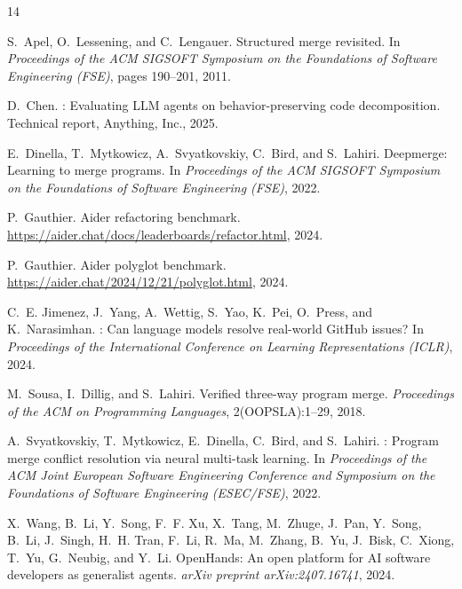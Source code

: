 \documentclass[11pt,a4paper]{article}
\begin{document}
\begin{thebibliography}{14}

S.~Apel, O.~Lessening, and C.~Lengauer.
\newblock Structured merge revisited.
\newblock In \emph{Proceedings of the ACM SIGSOFT Symposium on the Foundations of Software Engineering (FSE)}, pages 190--201, 2011.

D.~Chen.
: Evaluating {LLM} agents on behavior-preserving code decomposition.
\newblock Technical report, Anything, Inc., 2025.

E.~Dinella, T.~Mytkowicz, A.~Svyatkovskiy, C.~Bird, and S.~Lahiri.
\newblock Deepmerge: Learning to merge programs.
\newblock In \emph{Proceedings of the ACM SIGSOFT Symposium on the Foundations of Software Engineering (FSE)}, 2022.

P.~Gauthier.
\newblock Aider refactoring benchmark.
\newblock \url{https://aider.chat/docs/leaderboards/refactor.html}, 2024.

P.~Gauthier.
\newblock Aider polyglot benchmark.
\newblock \url{https://aider.chat/2024/12/21/polyglot.html}, 2024.

C.~E. Jimenez, J.~Yang, A.~Wettig, S.~Yao, K.~Pei, O.~Press, and K.~Narasimhan.
: Can language models resolve real-world {GitHub} issues?
\newblock In \emph{Proceedings of the International Conference on Learning Representations (ICLR)}, 2024.

M.~Sousa, I.~Dillig, and S.~Lahiri.
\newblock Verified three-way program merge.
\newblock \emph{Proceedings of the ACM on Programming Languages}, 2(OOPSLA):1--29, 2018.

A.~Svyatkovskiy, T.~Mytkowicz, E.~Dinella, C.~Bird, and S.~Lahiri.
: Program merge conflict resolution via neural multi-task learning.
\newblock In \emph{Proceedings of the ACM Joint European Software Engineering Conference and Symposium on the Foundations of Software Engineering (ESEC/FSE)}, 2022.

X.~Wang, B.~Li, Y.~Song, F.~F. Xu, X.~Tang, M.~Zhuge, J.~Pan, Y.~Song, B.~Li, J.~Singh, H.~H. Tran, F.~Li, R.~Ma, M.~Zhang, B.~Yu, J.~Bisk, C.~Xiong, T.~Yu, G.~Neubig, and Y.~Li.
\newblock Open{H}ands: An open platform for {AI} software developers as generalist agents.
\newblock \emph{arXiv preprint arXiv:2407.16741}, 2024.


\end{thebibliography}
\end{document}
